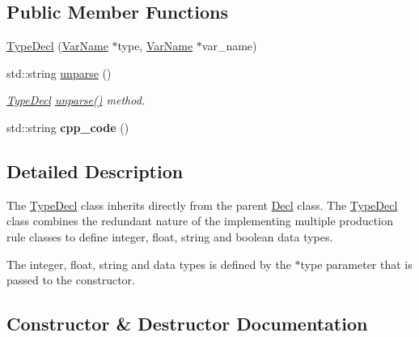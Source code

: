 \subsection*{Public Member Functions}
\begin{DoxyCompactItemize}
\item 
\hyperlink{classfcal_1_1ast_1_1TypeDecl_a4c868271f28ab2f823c857b5652d8003}{Type\+Decl} (\hyperlink{classfcal_1_1ast_1_1VarName}{Var\+Name} $\ast$type, \hyperlink{classfcal_1_1ast_1_1VarName}{Var\+Name} $\ast$var\+\_\+name)
\item 
std\+::string \hyperlink{classfcal_1_1ast_1_1TypeDecl_a9b43062210aaf0501a180a4356f020e9}{unparse} ()
\begin{DoxyCompactList}\small\item\em \hyperlink{classfcal_1_1ast_1_1TypeDecl}{Type\+Decl} \hyperlink{classfcal_1_1ast_1_1TypeDecl_a9b43062210aaf0501a180a4356f020e9}{unparse()} method. \end{DoxyCompactList}\item 
std\+::string {\bfseries cpp\+\_\+code} ()\hypertarget{classfcal_1_1ast_1_1TypeDecl_a12b9b2cb78a0d6b3fd40f80844c2a029}{}\label{classfcal_1_1ast_1_1TypeDecl_a12b9b2cb78a0d6b3fd40f80844c2a029}

\end{DoxyCompactItemize}


\subsection{Detailed Description}
The \hyperlink{classfcal_1_1ast_1_1TypeDecl}{Type\+Decl} class inherits directly from the parent \hyperlink{classfcal_1_1ast_1_1Decl}{Decl} class. The \hyperlink{classfcal_1_1ast_1_1TypeDecl}{Type\+Decl} class combines the redundant nature of the implementing multiple production rule classes to define integer, float, string and boolean data types.

The integer, float, string and data types is defined by the $\ast$type parameter that is passed to the constructor. 

\subsection{Constructor \& Destructor Documentation}
